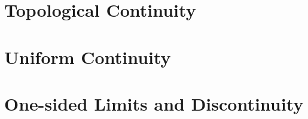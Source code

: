 \documentclass[a4paper, openany]{book}
\begin{document}
\section{Topological Continuity}

\newpage

\section{Uniform Continuity}

\newpage

\section{One-sided Limits and Discontinuity}

\newpage
\end{document}
